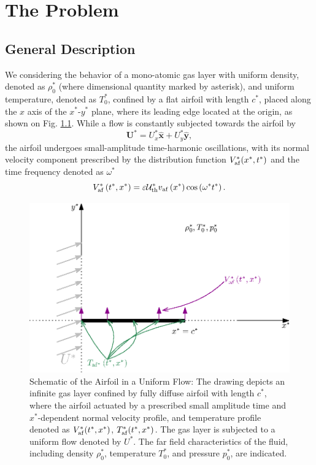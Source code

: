 \chapter{The Problem}
\section{General Description}
We considering the behavior of a mono-atomic gas layer with uniform density, denoted as $\rho_0^*$ (where dimensional quantity marked by asterisk), and uniform temperature, denoted as $T_0^*$, confined by a flat airfoil with length $c^*$, placed along the $x$ axis of the $x^*$-$y^*$ plane, where its leading edge located at the origin, as shown on Fig. \ref{fig:problem_description}. While a flow is constantly subjected towards the airfoil by
\begin{equation}
    \mathbf{U^*}=U_x^*\hat{\mathbf{x}} + U_y^*\hat{\mathbf{y}}
    ,
\end{equation}
the airfoil undergoes small-amplitude time-harmonic oscillations, with its normal velocity component prescribed by the distribution function $V_{\mathrm{af}}^*(x^*,t^*)$ and the time frequency denoted as $\omega^*$
\begin{equation} \label{eq:V_af}
    V_{\mathrm{af}}^*\left(t^*,x^*\right)
    =
    \varepsilon \mathcal{U}_{\mathrm{th}}^* v_{\mathrm{af}}\left(x^*\right)
    \cos\left(\omega^* t^*\right)
    .
\end{equation}
\begin{figure}[ht]
    \centering
    \includegraphics{drawings/problem_description.eps}
    \caption{\footnotesize Schematic of the Airfoil in a Uniform Flow: The drawing depicts an infinite gas layer confined by fully diffuse airfoil with length $c^*$, where the airfoil actuated by a prescribed small amplitude time and $x^*$-dependent normal velocity profile, and temperature profile denoted as $V_{\mathrm{af}}^*(t^*,x^*)$, $T_{\mathrm{af}}^*(t^*,x^*)$. The gas layer is subjected to a uniform flow denoted by $U^*$. The far field characteristics of the fluid, including density $\rho_0^*$, temperature $T_0^*$, and pressure $p_0^*$, are indicated.}
    \label{fig:problem_description}
\end{figure}
